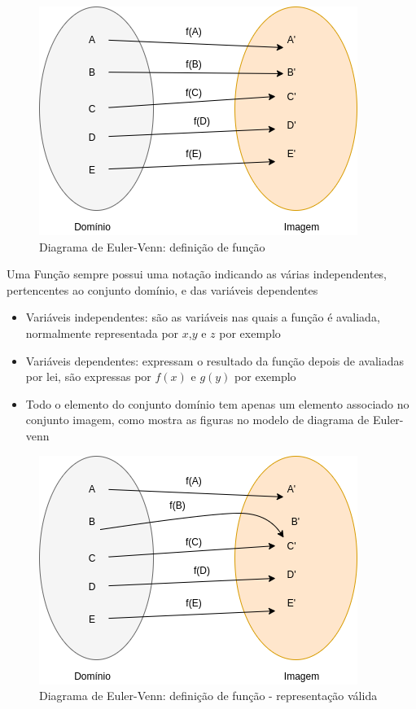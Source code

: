 \begin{multicols*}{2}
                \begin{figure}[H]
                \centering
                \caption{Diagrama de Euler-Venn: definição de função}
                \includegraphics[scale=0.4]{assets/rafael/img.png}
                \end{figure}
                Uma Função sempre possui uma notação indicando as várias independentes, pertencentes ao 				conjunto domínio, e das variáveis dependentes
                \begin{itemize}
                    \item Variáveis independentes: são as variáveis nas quais a função é avaliada, 											normalmente representada por $x$,$y$ e $z$ por exemplo
                    \item Variáveis dependentes: expressam o resultado da função depois de avaliadas por 							lei, são expressas por $f(x)$ e $g(y)$ por exemplo
                    \item Todo o elemento do conjunto domínio tem apenas um elemento associado no conjunto 							imagem, como mostra as figuras no modelo de diagrama de Euler-venn
                \end{itemize}
        
                \begin{figure}[H]
                    \centering
                    \caption{Diagrama de Euler-Venn: definição de função - representação válida}
                    \includegraphics[scale=0.4]{assets/rafael/img1.png}
                \end{figure}		
                

\end{multicols*}
